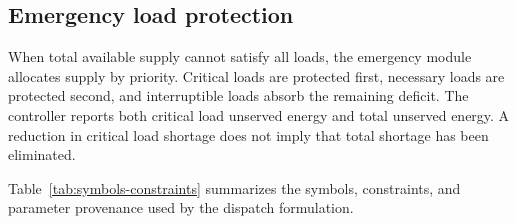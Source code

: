 \subsection{Emergency load
protection}\label{emergency-load-protection}

When total available supply cannot satisfy all loads, the emergency
module allocates supply by priority. Critical loads are protected first,
necessary loads are protected second, and interruptible loads absorb the
remaining deficit. The controller reports both critical load unserved
energy and total unserved energy. A reduction in critical load shortage
does not imply that total shortage has been eliminated.

Table~\ref{tab:symbols-constraints} summarizes the symbols, constraints, and
parameter provenance used by the dispatch formulation.

